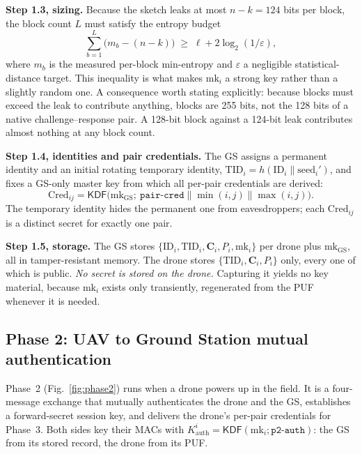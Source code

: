 \documentclass[journal]{IEEEtran}
\begin{document}
\textbf{Step 1.3, sizing.} Because the sketch leaks at most $n-k = 124$ bits
per block, the block count $L$ must satisfy the entropy budget
\begin{equation}
\textstyle\sum_{b=1}^{L}\big(m_b - (n-k)\big) \;\ge\; \ell + 2\log_2(1/\varepsilon),
\label{eq:budget}
\end{equation}
where $m_b$ is the measured per-block min-entropy and $\varepsilon$ a negligible
statistical-distance target. This inequality is what makes $\text{mk}_i$ a
strong key rather than a slightly random one. A consequence worth stating
explicitly: because blocks must exceed the leak to contribute anything, blocks
are 255 bits, not the 128 bits of a native challenge--response pair. A 128-bit
block against a 124-bit leak contributes almost nothing at any block count.

\textbf{Step 1.4, identities and pair credentials.} The GS assigns a permanent
identity and an initial rotating temporary identity,
$\text{TID}_i = h(\text{ID}_i \|\text{seed}_i')$, and fixes a GS-only master key
from which all per-pair credentials are derived:
\begin{equation}
\text{Cred}_{ij} = \mathsf{KDF}\big(\text{mk}_{\text{GS}};\
\texttt{pair-cred} \| \min(i,j) \| \max(i,j)\big).
\end{equation}
The temporary identity hides the permanent one from eavesdroppers; each
$\text{Cred}_{ij}$ is a distinct secret for exactly one pair.

\textbf{Step 1.5, storage.} The GS stores
$\{\text{ID}_i, \text{TID}_i, \bm{C}_i, P_i, \text{mk}_i\}$ per drone plus
$\text{mk}_{\text{GS}}$, all in tamper-resistant memory. The drone stores
$\{\text{TID}_i, \bm{C}_i, P_i\}$ only, every one of which is public.
\emph{No secret is stored on the drone.} Capturing it yields no key material,
because $\text{mk}_i$ exists only transiently, regenerated from the PUF
whenever it is needed.

\subsection{Phase 2: UAV to Ground Station mutual authentication}
\label{sec:p2}

Phase~2 (Fig.~\ref{fig:phase2}) runs when a drone powers up in the field. It is
a four-message exchange that mutually authenticates the drone and the GS,
establishes a forward-secret session key, and delivers the drone's per-pair
credentials for Phase~3. Both sides key their MACs with
$K^{i}_{\text{auth}} = \mathsf{KDF}(\text{mk}_i;\texttt{p2-auth})$: the GS from
its stored record, the drone from its PUF.
\end{document}
